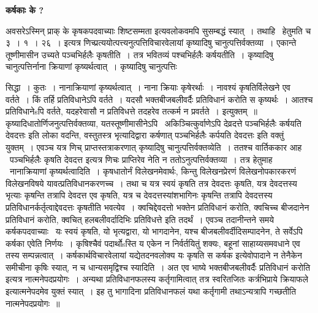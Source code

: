 \documentclass[11pt, openany]{book}
\begin{document}
\begin{center}
\textbf{\Large कर्षकाः के ?}
\end{center}

अवसरेऽस्मिन् प्राक् के कृषकपदवाच्याः शिष्टसम्मता इत्यवलोकवमपि सुसम्बद्धं स्यात्~। तथाहि \textendash\ हेतुमति च ३~। १~। २६~। इत्यत्र णिच्प्रत्ययोत्पत्त्यनुत्पत्तिविचारवेलायां कृष्यादिषु चानुत्पत्तिर्वक्तव्या~। एकान्ते तूष्णीमासीन उच्यते पञ्चभिर्हलैः कृषतीति~। तत्र भवितव्यं पश्चभिर्हलैः कर्षयतीति~। कृष्यादिषु चानुत्पत्तिर्नाना क्रियाणां कृष्यर्थत्वात्~। कृष्यादिषु चानुत्पत्तिः

\newpage

\noindent
सिद्धा~। कुतः~। नानाक्रियाणां कृष्यर्थत्वात्~। नाना क्रियाः कृषेरर्थाः~। नावश्यं कृषतिर्विलेखने एव वर्तते~। किं तर्हि प्रतिविधानेऽपि वर्तते~। यदसौ भक्तबीजबलीवर्दैः प्रतिविधानं करोति स कृष्यर्थः~। आतश्च प्रतिविधानेsपि वर्तते, यदहरेवासौ न प्रतिविधत्ते तदहरेव तत्कर्म न प्रवर्तते~। इत्युक्तम्~॥\\

कृष्यादिधातोर्णिजनुत्पत्तिर्वक्तव्या, यतस्तूष्णीमासीनेऽपि \textendash\ अकिञ्चित्कुर्वाणेऽपि देव्रदत्ते {\qt पञ्चभिर्हलैः कर्षयति देवदत्तः} इति लोका वदन्ति, वस्तुतस्त्र भृत्यादिद्वारा कर्षणात् {\qt पञ्चभिर्हलैः कर्पयति देवदत्तः} इति वक्तुं युक्तम्~। एवञ्च यत्र णिच् प्राप्तस्तत्राकरणात् कृष्यादिषु चानुत्पत्तिर्वक्तव्येति~। ततश्च वार्तिककार आह \textendash\ पञ्चभिर्हलैः कृषति देवदत्त इत्यत्र णिचः प्राप्तिरेव नेति न ततोऽनुत्पत्तिर्वक्तव्या~। तत्र हेतुमाह \textendash\ नानाक्रियाणां कृष्यर्थत्वादिति~। कृषधातोर्नं विलेखनमेवार्थः, किन्तु विलेखनप्रेरणं विलेखनोपकारकरणं विलेखनविषये यावत्प्रतिविधानकरणच्च~। तथा च यत्र स्वयं कृषति तत्र देवदत्तः कृषति, यत्र देवदत्तस्य भृत्याः कृषन्ति तत्रापि देवदत्त एव कृषति, यत्र च देवदत्तस्यांशभागिनः कृषन्ति तत्रापि देवदत्तस्य प्रतिविधानर्कर्तृत्वाद्देवदत्तः कृषतीति भवत्येव~। क्वचिद्देवदत्तो भक्तेन प्रतिविधानं करोति, क्वचिच्च बीजदानेन प्रतिविधानं करोति, क्वचित् हलबलीवर्दादिभिः प्रतिविधत्ते इति तदर्थं~। एवञ्च तदानीन्तने समये कर्षकपदवाच्याः \textendash\ यः स्वयं कृषति, यो भृत्यद्वारा, यो भागदानेन, यश्च बीजबलीवर्दीदिसम्पादनेन, ते सर्वेऽपि कर्षका एवेति निर्णयः~। कृषिश्चैवं पदार्थोsस्ति य एकेन न निर्वर्तयितुं शक्यः, बहूनां साहाय्यसमवधाने एव तस्य सम्पन्नत्वात्~। कर्षकार्थविचारवेलायां यद्येतदनवलोक्य यः कृषति स कर्षक इत्येवोपादाने न तेनैकेन समीचीना कृषिः स्यात्, न च धान्यसमृद्विश्च स्यादिति~। अत एव भाष्ये {\qt भक्तबीजबलीवर्दैः प्रतिविधानं करोति} इत्यत्र नात्मनेपदप्रयोगः~। अन्यथा प्रतिविधानफलस्य कर्तृगामित्वात् तत्र {\qt स्वरितजितः कर्त्रभिप्राये क्रियाफले} इत्यात्मनेपदमेव युक्तं स्यात्~। इह तु भागादिना प्रतिविधानफलं यथा कर्तृगामी तथाऽन्यत्रापि गच्छतीति नात्मनेपदप्रयोगः~॥
\end{document}
